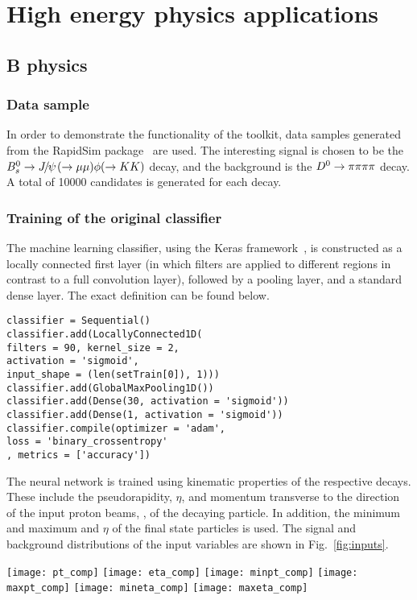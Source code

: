 \section{High energy physics applications}
\label{sec:hep}

\subsection{B physics}

\subsubsection{Data sample}

In order to demonstrate the functionality of the toolkit, data samples generated
from the RapidSim package~\cite{rapid} are used. The interesting signal is chosen
to be the ${{B}^0_{s}}\rightarrow{\ensuremath{{J\mskip -3mu/\mskip -2mu\psi\mskip 2mu}}}(\rightarrow\mu\mu )\phi (\rightarrow KK )$ decay, and the background is
the ${{D}^0}\rightarrow\pi\pi\pi\pi$ decay. A total of 10000 candidates is generated for each decay.

\subsubsection{Training of the original classifier}
\label{sec:orig_training}

The machine learning classifier, using the Keras framework~\cite{keras,adam},
is constructed as a locally connected first layer (in which filters are applied
to different regions in contrast to a full convolution layer), followed by a pooling layer,
and a standard dense layer. The exact definition can be found below.
\begin{lstlisting}
classifier = Sequential()
classifier.add(LocallyConnected1D(
filters = 90, kernel_size = 2,
activation = 'sigmoid',
input_shape = (len(setTrain[0]), 1)))
classifier.add(GlobalMaxPooling1D())
classifier.add(Dense(30, activation = 'sigmoid'))
classifier.add(Dense(1, activation = 'sigmoid'))
classifier.compile(optimizer = 'adam',
loss = 'binary_crossentropy'
, metrics = ['accuracy'])
\end{lstlisting}

The neural network is trained using kinematic properties of the respective decays.
These include the pseudorapidity, $\eta$, and momentum transverse to the direction of the
input proton beams, \pt, of the decaying particle. In addition, the minimum and maximum \pt and $\eta$
of the final state particles is used. The signal and background distributions of the input variables
are shown in Fig.~\ref{fig:inputs}.
%
\begin{figure*}[t]
\centering
\texttt{[image: pt\_comp]}
\texttt{[image: eta\_comp]}
\texttt{[image: minpt\_comp]}
\texttt{[image: maxpt\_comp]}
\texttt{[image: mineta\_comp]}
\texttt{[image: maxeta\_comp]}
\caption{\small Comparison of the signal and background distributions
used to train the Keras B decay classifier.}
\label{fig:inputs}
\end{figure*}

